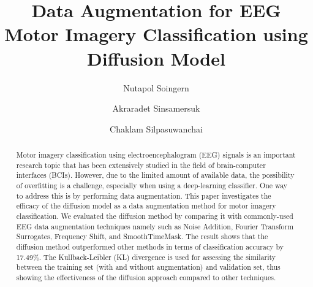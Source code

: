 \documentclass[runningheads]{llncs}
\begin{document}
\title{Data Augmentation for EEG Motor Imagery Classification using Diffusion Model}
\author{Nutapol Soingern \and
Akraradet Sinsamersuk \and
Chaklam Silpasuwanchai}


\maketitle


\begin{abstract}
\sloppy
Motor imagery classification using electroencephalogram (EEG) signals is an important research topic that has been extensively studied in the field of brain-computer interfaces (BCIs). 
However, due to the limited amount of available data, the possibility of overfitting is a challenge, especially when using a deep-learning classifier. 
One way to address this is by performing data augmentation. 
This paper investigates the efficacy of the diffusion model as a data augmentation method for motor imagery classification. 
We evaluated the diffusion method by comparing it with commonly-used EEG data augmentation techniques namely such as Noise Addition, Fourier Transform Surrogates, Frequency Shift, and SmoothTimeMask. 
The result shows that the diffusion method outperformed other methods in terms of classification accuracy by 17.49\%. 
The Kullback-Leibler (KL) divergence is used for assessing the similarity between the training set (with and without augmentation) and validation set, thus showing the effectiveness of the diffusion approach compared to other techniques.
\end{abstract}
\end{document}
